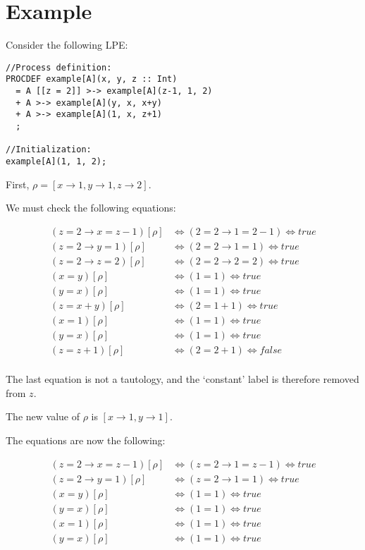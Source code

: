 \section{Example}

Consider the following LPE:

\begin{lstlisting}
//Process definition:
PROCDEF example[A](x, y, z :: Int)
  = A [[z = 2]] >-> example[A](z-1, 1, 2)
  + A >-> example[A](y, x, x+y)
  + A >-> example[A](1, x, z+1)
  ;

//Initialization:
example[A](1, 1, 2);
\end{lstlisting}

First, $\rho = [ x \rightarrow 1, y \rightarrow 1, z \rightarrow 2 ]$.

We must check the following equations:

\begin{align*}
(z = 2 \rightarrow x = z-1)[\rho] &\Leftrightarrow (2 = 2 \rightarrow 1 = 2-1) \Leftrightarrow \textit{true} \\
(z = 2 \rightarrow y = 1)[\rho] &\Leftrightarrow (2 = 2 \rightarrow 1 = 1) \Leftrightarrow \textit{true} \\
(z = 2 \rightarrow z = 2)[\rho] &\Leftrightarrow (2 = 2 \rightarrow 2 = 2) \Leftrightarrow \textit{true} \\
(x = y)[\rho] &\Leftrightarrow (1 = 1) \Leftrightarrow \textit{true} \\
(y = x)[\rho] &\Leftrightarrow (1 = 1) \Leftrightarrow \textit{true} \\
(z = x+y)[\rho] &\Leftrightarrow (2 = 1+1) \Leftrightarrow \textit{true} \\
(x = 1)[\rho] &\Leftrightarrow (1 = 1) \Leftrightarrow \textit{true} \\
(y = x)[\rho] &\Leftrightarrow (1 = 1) \Leftrightarrow \textit{true} \\
(z = z+1)[\rho] &\Leftrightarrow (2 = 2+1) \Leftrightarrow \textit{false} \\
\end{align*}

The last equation is not a tautology, and the `constant' label is therefore removed from $z$.

The new value of $\rho$ is $[ x \rightarrow 1, y \rightarrow 1 ]$.

\clearpage
The equations are now the following:

\begin{align*}
(z = 2 \rightarrow x = z-1)[\rho] &\Leftrightarrow (z = 2 \rightarrow 1 = z-1) \Leftrightarrow \textit{true} \\
(z = 2 \rightarrow y = 1)[\rho] &\Leftrightarrow (z = 2 \rightarrow 1 = 1) \Leftrightarrow \textit{true} \\
(x = y)[\rho] &\Leftrightarrow (1 = 1) \Leftrightarrow \textit{true} \\
(y = x)[\rho] &\Leftrightarrow (1 = 1) \Leftrightarrow \textit{true} \\
(x = 1)[\rho] &\Leftrightarrow (1 = 1) \Leftrightarrow \textit{true} \\
(y = x)[\rho] &\Leftrightarrow (1 = 1) \Leftrightarrow \textit{true} \\
\end{align*}

